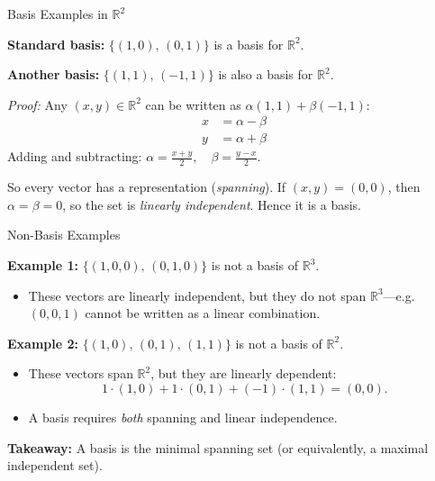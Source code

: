 \documentclass[aspectratio=169, handout, t]{beamer}
\numberwithin{equation}{section}
\begin{document}
\begin{frame}{Basis Examples in $\mathbb{R}^2$}

\textbf{Standard basis:} $\{(1,0),\,(0,1)\}$ is a basis for $\mathbb{R}^2$.

\vspace{0.3cm}

\textbf{Another basis:} $\{(1,1),\,(-1,1)\}$ is also a basis for $\mathbb{R}^2$.

\vspace{0.2cm}

\emph{Proof:} Any $(x,y)\in\mathbb{R}^2$ can be written as $\alpha(1,1)+\beta(-1,1)$:
\begin{align*}
x &= \alpha - \beta \\
y &= \alpha + \beta
\end{align*}
Adding and subtracting: $\alpha=\frac{x+y}{2},\quad \beta=\frac{y-x}{2}.$

\vspace{0.2cm}

So every vector has a representation (\emph{spanning}). If $(x,y)=(0,0)$, then $\alpha=\beta=0$, so the set is \emph{linearly independent}. Hence it is a basis.

\end{frame}

\begin{frame}{Non-Basis Examples}

\textbf{Example 1:} $\{(1,0,0),\,(0,1,0)\}$ is \alert{not} a basis of $\mathbb{R}^3$.
\begin{itemize}
    \item These vectors are linearly independent, but they do not span $\mathbb{R}^3$---e.g.\ $(0,0,1)$ cannot be written as a linear combination.
\end{itemize}

\vspace{0.4cm}

\textbf{Example 2:} $\{(1,0),\,(0,1),\,(1,1)\}$ is \alert{not} a basis of $\mathbb{R}^2$.
\begin{itemize}
    \item These vectors span $\mathbb{R}^2$, but they are linearly dependent:
    \[
    1\cdot(1,0) + 1\cdot(0,1) + (-1)\cdot(1,1) = (0,0).
    \]
    \item A basis requires \emph{both} spanning and linear independence.
\end{itemize}

\vspace{0.4cm}

\textbf{Takeaway:} A basis is the minimal spanning set (or equivalently, a maximal independent set).

\end{frame}
\end{document}
